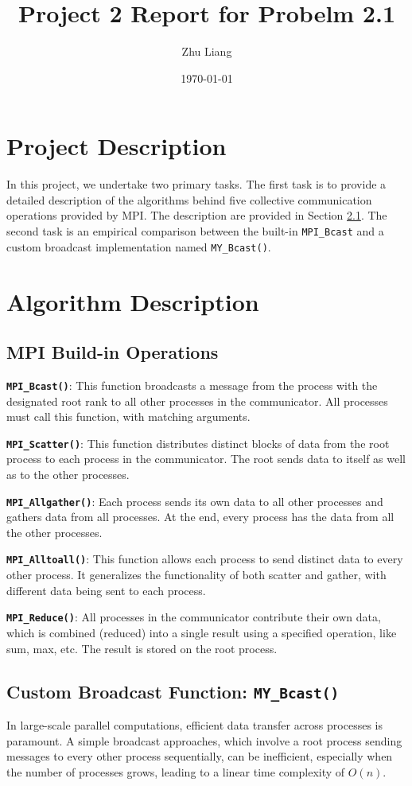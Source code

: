 \documentclass[12pt,a4paper]{article}
\title{Project 2 Report for Probelm 2.1}
\author{Zhu Liang}
\date{\today}
\begin{document}
\maketitle

\section{Project Description}
In this project, we undertake two primary tasks. 
The first task is to provide a detailed description of the algorithms behind five collective communication operations provided by MPI.
The description are provided in Section \ref{sec:mpi_buildin}.
The second task is an empirical comparison between the built-in \texttt{MPI\_Bcast} and a custom broadcast implementation named \texttt{MY\_Bcast()}.


\section{Algorithm Description}
\subsection{MPI Build-in Operations}
\label{sec:mpi_buildin}


\textbf{\texttt{MPI\_Bcast()}}: This function broadcasts a message from the process with the designated root rank to all other processes in the communicator. All processes must call this function, with matching arguments.

\textbf{\texttt{MPI\_Scatter()}}: This function distributes distinct blocks of data from the root process to each process in the communicator. The root sends data to itself as well as to the other processes.

\textbf{\texttt{MPI\_Allgather()}}: Each process sends its own data to all other processes and gathers data from all processes. At the end, every process has the data from all the other processes.

\textbf{\texttt{MPI\_Alltoall()}}: This function allows each process to send distinct data to every other process. It generalizes the functionality of both scatter and gather, with different data being sent to each process.

\textbf{\texttt{MPI\_Reduce()}}: All processes in the communicator contribute their own data, which is combined (reduced) into a single result using a specified operation, like sum, max, etc. The result is stored on the root process.


\subsection{Custom Broadcast Function: \texttt{MY\_Bcast()}}
In large-scale parallel computations, efficient data transfer across processes is paramount. 
A simple broadcast approaches, 
which involve a root process sending messages to every other process sequentially, 
can be inefficient, 
especially when the number of processes grows, 
leading to a linear time complexity of $O(n)$.
\end{document}
